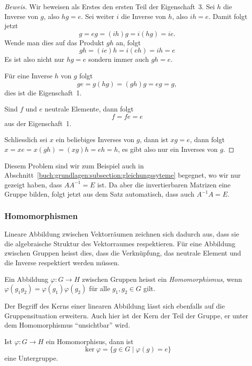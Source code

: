 \begin{proof}[Beweis]
Wir beweisen als Erstes den ersten Teil der Eigenschaft~3.
Sei $h$ die Inverse von $g$, also $hg=e$.
Sei weiter $i$ die Inverse von $h$, also $ih=e$.
Damit folgt jetzt
\[
g
=
eg
=
(ih)g
=
i(hg)
=
ie.
\]
Wende man dies auf das Produkt $gh$ an, folgt
\[
gh
=
(ie)h
=
i(eh)
=
ih
=
e
\]
Es ist also nicht nur $hg=e$ sondern immer auch $gh=e$.

Für eine Inverse $h$ von $g$ folgt
\[
ge
=
g(hg)
=
(gh)g
=
eg
=
g,
\]
dies ist die Eigenschaft~1.

Sind $f$ und $e$ neutrale Elemente, dann folgt
\[
f = fe = e
\]
aus der Eigenschaft~1.

Schliesslich sei $x$ ein beliebiges Inverses von $g$, dann ist
$xg=e$, dann folgt
$x=xe=x(gh)=(xg)h = eh = h$, es gibt also nur ein Inverses von $g$.
\end{proof}

Diesem Problem sind wir zum Beispiel auch in
Abschnitt~\ref{buch:grundlagen:subsection:gleichungssyteme}
begegnet, wo wir nur gezeigt haben, dass $AA^{-1}=E$ ist.
Da aber die invertierbaren Matrizen eine Gruppe
bilden, folgt jetzt aus dem Satz automatisch, dass auch $A^{-1}A=E$.

\subsubsection{Homomorphismen} \label{buch:gruppen:subsection:homomorphismen}
Lineare Abbildung zwischen Vektorräumen zeichnen sich dadurch aus,
dass sie die algebraische Struktur des Vektorraumes respektieren.
Für eine Abbildung zwischen Gruppen heisst dies, dass die Verknüpfung,
das neutrale Element und die Inverse respektiert werden müssen.

\begin{definition}
Ein Abbildung $\varphi\colon G\to H$ zwischen Gruppen heisst ein
{\em Homomorphismus}, wenn 
$\varphi(g_1g_2)=\varphi(g_1)\varphi(g_2)$ für alle $g_1,g_2\in G$ gilt.
%
\end{definition}

Der Begriff des Kerns einer linearen Abbildung lässt sich ebenfalls auf
die Gruppensituation erweitern.
Auch hier ist der Kern der Teil der Gruppe, er unter dem 
Homomorphismus ``unsichtbar'' wird.

\begin{definition}
Ist $\varphi\colon G\to H$ ein Homomorphisus, dann ist
\[
\ker\varphi
=
\{g\in G\;|\; \varphi(g)=e\}
\]
eine Untergruppe.
%
\end{definition}

